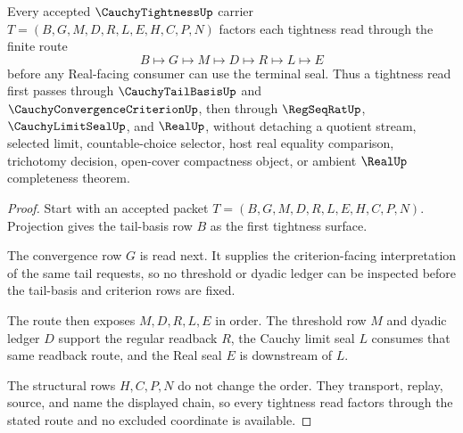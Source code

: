 \begin{theorem}
\label{thm:cauchy-tightness-tail-basis-handoff}
Every accepted $\CauchyTightnessUp$ carrier $T=(B,G,M,D,R,L,E,H,C,P,N)$ factors each tightness read through the finite route
$$
B \longmapsto G \longmapsto M \longmapsto D \longmapsto R \longmapsto L \longmapsto E
$$
before any Real-facing consumer can use the terminal seal. Thus a tightness read first passes through $\CauchyTailBasisUp$ and $\CauchyConvergenceCriterionUp$, then through $\RegSeqRatUp$, $\CauchyLimitSealUp$, and $\RealUp$, without detaching a quotient stream, selected limit, countable-choice selector, host real equality comparison, trichotomy decision, open-cover compactness object, or ambient $\RealUp$ completeness theorem.
\end{theorem}
\begin{proof}
Start with an accepted packet $T=(B,G,M,D,R,L,E,H,C,P,N)$. Projection gives the tail-basis row $B$ as the first tightness surface.

The convergence row $G$ is read next. It supplies the criterion-facing interpretation of the same tail requests, so no threshold or dyadic ledger can be inspected before the tail-basis and criterion rows are fixed.

The route then exposes $M,D,R,L,E$ in order. The threshold row $M$ and dyadic ledger $D$ support the regular readback $R$, the Cauchy limit seal $L$ consumes that same readback route, and the Real seal $E$ is downstream of $L$.

The structural rows $H,C,P,N$ do not change the order. They transport, replay, source, and name the displayed chain, so every tightness read factors through the stated route and no excluded coordinate is available.
\end{proof}


